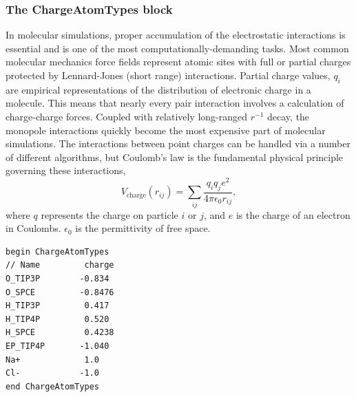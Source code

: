 \documentclass[]{book}
\begin{document}
\subsubsection{\label{section:ffCharge}The ChargeAtomTypes block}

In molecular simulations, proper accumulation of the electrostatic
interactions is essential and is one of the most
computationally-demanding tasks.  Most common molecular mechanics
force fields represent atomic sites with full or partial charges
protected by Lennard-Jones (short range) interactions.  Partial charge
values, $q_i$ are empirical representations of the distribution of
electronic charge in a molecule.  This means that nearly every pair
interaction involves a calculation of charge-charge forces.  Coupled
with relatively long-ranged $r^{-1}$ decay, the monopole interactions
quickly become the most expensive part of molecular simulations.  The
interactions between point charges can be handled via a number of
different algorithms, but Coulomb's law is the fundamental physical
principle governing these interactions,
\begin{equation}
  V_{\text{charge}}(r_{ij}) = \sum_{ij}\frac{q_iq_je^2}{4 \pi \epsilon_0
    r_{ij}}, 
\end{equation}
where $q$ represents the charge on particle $i$ or $j$, and $e$ is the
charge of an electron in Coulombs.  $\epsilon_0$ is the permittivity
of free space.

\begin{lstlisting}[caption={[An example of a ChargeAtomTypes block.] A
simple example of a ChargeAtomTypes block.   Units for
charge are in multiples of electron charge.},
label={sch:ChargeAtomTypesBlock}]
begin ChargeAtomTypes
// Name         charge
O_TIP3P        -0.834
O_SPCE         -0.8476
H_TIP3P         0.417
H_TIP4P         0.520
H_SPCE          0.4238
EP_TIP4P       -1.040
Na+             1.0
Cl-            -1.0
end ChargeAtomTypes
\end{lstlisting}
\end{document}
